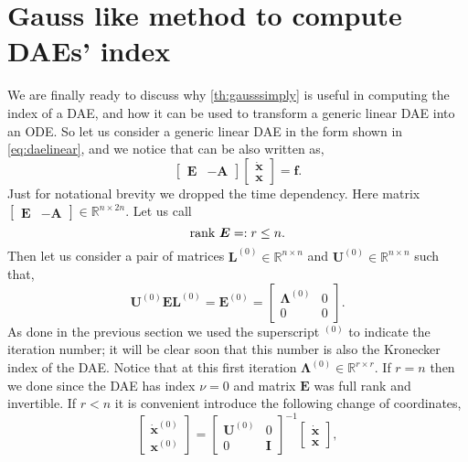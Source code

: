 	\section{Gauss like method to compute DAEs' index}
		We are finally ready to discuss why \cref{th:gausssimply} is useful in computing the index of a DAE, and how it can be used to transform a generic linear DAE into an ODE. So let us consider a generic linear DAE in the form shown in \cref{eq:daelinear}, and we notice that can be also written as, 
		\begin{equation}
			\label{eq:computationalDAE}
			\begin{bmatrix}
				\bm{E} & -\bm{A} 
			\end{bmatrix}
			\begin{bmatrix}
				\dot{\bm{x}} \\
				\bm{x}
			\end{bmatrix}
			= \bm{f}.
		\end{equation}
		Just for notational brevity we dropped the time dependency. Here matrix $\begin{bmatrix}\bm{E} & -\bm{A}\end{bmatrix}\in\mathbb{R}^{n\times 2n}$. Let us call
		\begin{equation}
			\textnormal{rank}~\bm{E} =: r \leq n.
		\end{equation}
		Then let us consider a pair of matrices $\bm{L}^{(0)}\in\mathbb{R}^{n\times n}$ and $\bm{U}^{(0)}\in\mathbb{R}^{n\times n}$ such that,
		\begin{equation*}
			\bm{U}^{(0)}\bm{E}\bm{L}^{(0)} = \bm{E}^{(0)} = 
			\begin{bmatrix}
				\bm{\Lambda}^{(0)} 	& 0 \\
				0 				& 0 
			\end{bmatrix}.
		\end{equation*}
		As done in the previous section we used the superscript $^{(0)}$ to indicate the iteration number; it will be clear soon that this number is also the Kronecker index of the DAE. Notice that at this first iteration $\bm{\Lambda}^{(0)}\in\mathbb{R}^{r\times r}$. If $r=n$ then we done since the DAE has index $\nu = 0$ and matrix $\bm{E}$ was full rank and invertible. If $r<n$ it is convenient introduce the following change of coordinates, 
		\begin{equation}
			\begin{bmatrix}
				\dot{\bm{x}}^{(0)} \\
				\bm{x}^{(0)} 
			\end{bmatrix}
			=
			\begin{bmatrix}
				\bm{U}^{(0)} & 0 \\
				0 & \bm{I} 
			\end{bmatrix}^{-1}
			\begin{bmatrix}
				\dot{\bm{x}} \\
				\bm{x}
			\end{bmatrix},
		\end{equation}
